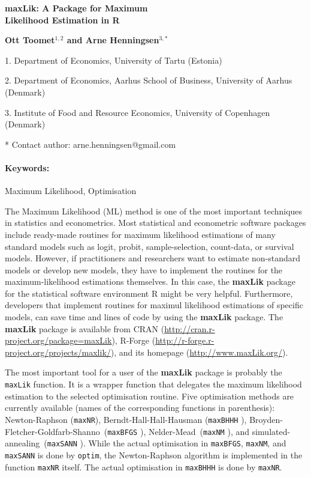 \documentclass[12pt,a4paper]{article}
\renewcommand{\title}[1]{\begin{center}{\bf \LARGE #1}\end{center}}
\newcommand{\keywords}{\paragraph{Keywords:}}
\newcommand{\code}[1]{\texttt{#1}}
\begin{document}
\pagestyle{empty}

\title{maxLik: A Package for Maximum\\[3mm]Likelihood Estimation in \textsf{R}}

\begin{center}
  {\bf Ott Toomet$^{1,2}$ and Arne Henningsen$^{3,*}$}
\end{center}

\begin{affiliations}
1. Department of Economics, University of Tartu (Estonia)\par
2. Department of Economics, Aarhus School of Business, University of Aarhus (Denmark)\par
3. Institute of Food and Resource Economics, University of Copenhagen (Denmark)\par
* Contact author: arne.henningsen@gmail.com
\end{affiliations}

\keywords Maximum Likelihood, Optimisation

\vskip 0.8cm

The Maximum Likelihood (ML) method is one of the most important
techniques in statistics and econometrics.
Most statistical and econometric software packages include
ready-made routines for maximum likelihood estimations
of many standard models such as logit, probit, sample-selection,
count-data, or survival models.
However, if practitioners and researchers want to estimate
non-standard models or develop new models,
they have to implement the routines
for the maximum-likelihood estimations themselves.
In this case, the \textbf{maxLik} package~\cite{r-maxlik-0.5}
for the statistical software environment \textsf{R} \cite{r-project09}
might be very helpful.
Furthermore, developers that implement routines for maximul likelihood
estimations of specific models,
can save time and lines of code by using the \textbf{maxLik} package.
The \textbf{maxLik} package is available from
CRAN (\url{http://cran.r-project.org/package=maxLik}),
R-Forge (\url{http://r-forge.r-project.org/projects/maxlik/}), and its
homepage (\url{http://www.maxLik.org/}).

The most important tool for a user of the \textbf{maxLik} package
is probably the \code{maxLik} function.
It is a wrapper function
that delegates the maximum likelihood estimation
to the selected optimisation routine.
Five optimisation methods are currently available
(names of the corresponding functions in parenthesis):
Newton-Raphson (\code{maxNR}),
Berndt-Hall-Hall-Hausman (\code{maxBHHH} \cite{berndt74}),
Broyden-Fletcher-Goldfarb-Shanno~(\code{maxBFGS}
\cite{broyden70,fletcher70,goldfarb70,shanno70}),
Nelder-Mead~(\code{maxNM} \cite{nelder65}), and
simulated-annealing~(\code{maxSANN} \cite{belisle92}).
While the actual optimisation in
\code{maxBFGS}, \code{maxNM}, and \code{maxSANN}
is done by \code{optim},
the Newton-Raphson algorithm is implemented
in the function \code{maxNR} itself.
The actual optimisation in \code{maxBHHH}
is done by \code{maxNR}.
\end{document}
